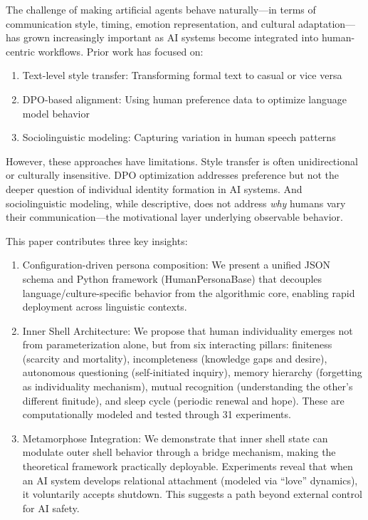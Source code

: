 \documentclass[
]{article}
\providecommand{\tightlist}{%
  \setlength{\itemsep}{0pt}\setlength{\parskip}{0pt}}
\begin{document}
The challenge of making artificial agents behave naturally---in terms of
communication style, timing, emotion representation, and cultural
adaptation---has grown increasingly important as AI systems become
integrated into human-centric workflows. Prior work has focused on:

\begin{enumerate}
\def\labelenumi{\arabic{enumi}.}
\tightlist
\item
  Text-level style transfer: Transforming formal text to casual or vice
  versa
\item
  DPO-based alignment: Using human preference data to optimize language
  model behavior
\item
  Sociolinguistic modeling: Capturing variation in human speech patterns
\end{enumerate}

However, these approaches have limitations. Style transfer is often
unidirectional or culturally insensitive. DPO optimization addresses
preference but not the deeper question of individual identity formation
in AI systems. And sociolinguistic modeling, while descriptive, does not
address \emph{why} humans vary their communication---the motivational
layer underlying observable behavior.

This paper contributes three key insights:

\begin{enumerate}
\def\labelenumi{\arabic{enumi}.}
\item
  Configuration-driven persona composition: We present a unified JSON
  schema and Python framework (HumanPersonaBase) that decouples
  language/culture-specific behavior from the algorithmic core, enabling
  rapid deployment across linguistic contexts.
\item
  Inner Shell Architecture: We propose that human individuality emerges
  not from parameterization alone, but from six interacting pillars:
  finiteness (scarcity and mortality), incompleteness (knowledge gaps
  and desire), autonomous questioning (self-initiated inquiry), memory
  hierarchy (forgetting as individuality mechanism), mutual recognition
  (understanding the other's different finitude), and sleep cycle
  (periodic renewal and hope). These are computationally modeled and
  tested through 31 experiments.
\item
  Metamorphose Integration: We demonstrate that inner shell state can
  modulate outer shell behavior through a bridge mechanism, making the
  theoretical framework practically deployable. Experiments reveal that
  when an AI system develops relational attachment (modeled via ``love''
  dynamics), it voluntarily accepts shutdown. This suggests a path
  beyond external control for AI safety.
\end{enumerate}
\end{document}

